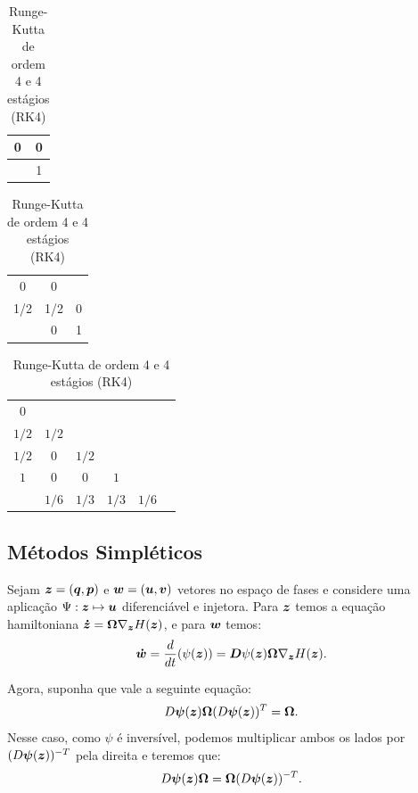 \begin{table}[H]
  \centering
  \begin{tabular}{c|c}
        0 & 0 \\
        \hline
          & 1
  \end{tabular}
  \caption{Euler explícito}
  \quad
  \begin{tabular}{c|cc}
        0 & 0 \\
        1/2 & 1/2 & 0 \\
        \hline
          & 0 & 1
  \end{tabular}
  \caption{Runge-Kutta de ordem 2 e 2 estágios (RK2)}
  \quad
  \begin{tabular}{c|ccccc}
      $0$      &       &       &       &\\
      $1/2$    & $1/2$ &       &       &\\
      $1/2$    & $0$   & $1/2$ &       &\\
      $1$      & $0$   & $0$   & $1$   & \\
      \hline
              & $1/6$ & $1/3$ & $1/3$ & $1/6$
  \end{tabular}
  \caption{Runge-Kutta de ordem 4 e 4 estágios (RK4)}
\end{table}

\subsection{Métodos Simpléticos}

Sejam $\bm z = (\bm q, \bm p)$ e $\bm w = (\bm u, \bm v)$ vetores no espaço de fases e considere uma aplicação $\Psi: \bm z \mapsto \bm u$ diferenciável e injetora. Para $\bm z$ temos a equação hamiltoniana $\bm {\dot z} = \bm \Omega \nabla_{\bm z} H(\bm z)$, e para $\bm w$ temos:
\begin{equation}\label{eq:equacao_w}
  \bm {\dot w} = \dfrac{d }{d t} (\psi(\bm z)) = \bm D \psi(\bm z) \bm \Omega \nabla_{\bm z} H(\bm z).
\end{equation}

Agora, suponha que vale a seguinte equação:
\begin{equation}\label{eq:criterio_simpletico}
  D \bm \psi(\bm z) \bm \Omega (D \bm \psi(\bm z))^T = \bm \Omega.
\end{equation}
Nesse caso, como $\psi$ é inversível, podemos multiplicar ambos os lados por $(D \bm \psi(\bm z))^{-T}$ pela direita e teremos que:
\begin{equation}
  D \bm \psi(\bm z) \bm \Omega = \bm \Omega (D \bm \psi(\bm z))^{-T}.
\end{equation}

